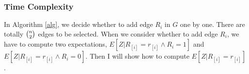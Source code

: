 \subsubsection{Time Complexity }
In Algorithm \ref{alg}, we decide whether to add edge $R_i$ in $G$ one by one. There are totally $\tbinom{n}{2}$ edges to be selected.
When we consider whether to add edge $R_i$, we have to compute two expectations, $E[Z|R_{[i]}=r_{[i]}\wedge R_i=1]$ and $E[Z|R_{[i]}=r_{[i]}\wedge R_i=0]$. Then I will show how to compute $E[Z|R_{[i]}=r_{[i]}]$.